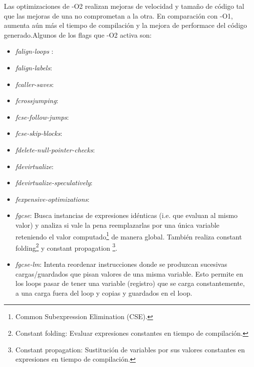 Las optimizaciones de -O2 realizan mejoras de velocidad y tamaño de código tal que las mejoras de una no comprometan a la otra. En comparación con -O1, aumenta aún más el tiempo de compilación y la mejora de performace del código generado.Algunos de los flags que -O2 activa son:

\begin{itemize}
	\item \textit{falign-loops }:
	\item \textit{falign-labels}:
	\item \textit{fcaller-saves}:
	\item \textit{fcrossjumping}:
	\item \textit{fcse-follow-jumps}:
	\item \textit{fcse-skip-blocks}:
	\item \textit{fdelete-null-pointer-checks}:
	\item \textit{fdevirtualize}:
	\item \textit{fdevirtualize-speculatively}:
	\item \textit{fexpensive-optimizations}:

	\item \textit{fgcse}: Busca instancias de expresiones idénticas (i.e. que evaluan al mismo valor) y analiza si vale la pena reemplazarlas por una única variable reteniendo el valor computado\footnote{Common Subexpression Elimination (CSE).} de manera global. También realiza constant folding\footnote{Constant folding: Evaluar expresiones constantes en tiempo de compilación.} y constant propagation \footnote{Constant propagation: Sustitución de variables por sus valores constantes en expresiones en tiempo de compilación.}.
	
  \item \textit{fgcse-lm}: Intenta reordenar instrucciones donde se produzcan sucesivas cargas/guardados que pisan valores de una misma variable. Esto permite en los loops pasar de tener una variable (registro) que se carga constantemente, a una carga fuera del loop y copias y guardados en el loop.
	

\end{itemize}
